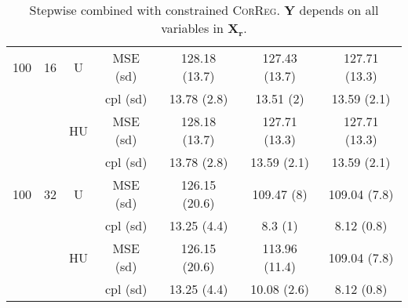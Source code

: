 \documentclass[11pt,a4paper]{article}
\begin{document}
\begin{table}[h!]
\begin{tabular}{|c|c|c|c|c|c|c|}
\hline
\hline %
100 & 16 & U&  MSE (sd) & 128.18 (13.7) & 127.43 (13.7) & 127.71 (13.3) \\
& & &  cpl (sd) & 13.78 (2.8) & 13.51 (2) & 13.59 (2.1) \\
 &  &HU & MSE (sd) & 128.18 (13.7) & 127.71 (13.3) & 127.71 (13.3) \\
& & & cpl (sd) & 13.78 (2.8) & 13.59 (2.1) & 13.59 (2.1) \\
\hline %
100 & 32 & U& MSE (sd) & 126.15 (20.6) & 109.47 (8) & 109.04 (7.8) \\
& & & cpl (sd) & 13.25 (4.4) & 8.3 (1) & 8.12 (0.8) \\
 &  &HU &  MSE (sd) & 126.15 (20.6) & 113.96 (11.4) & 109.04 (7.8) \\
& & & cpl (sd) & 13.25 (4.4) & 10.08 (2.6) & 8.12 (0.8) \\
\hline
\end{tabular} 
\caption{Stepwise  combined with constrained \textsc{CorReg}. $\boldsymbol{Y}$ depends on all variables in $\boldsymbol{X_r}$.}\label{YX2linstep}
\end{table}

\clearpage
\end{document}
